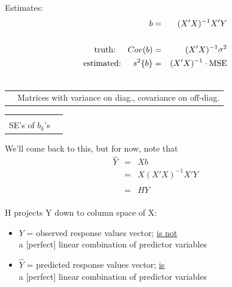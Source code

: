 \documentclass[12pt]{notes}
\begin{document}
Estimates:
\begin{eqnarray}
  b & = & (X' X)^{-1} X' Y \nonumber \\
   & \nonumber \\
  \mbox{truth: \hspace{1em}} Cov(b) & = & (X' X)^{-1} \sigma^2 \nonumber \\
  \mbox{estimated: \hspace{1em}}  s^2 \{ b \} & = & (X' X)^{-1} \cdot \mbox{MSE} \nonumber \\
   & \nonumber
\end{eqnarray}

\vspace{-8.5em}
\begin{tabular}{l l}
\hspace{30em} &
\begin{minipage}[t]{2in}
 Matrices with variance on diag., covariance on off-diag.
\end{minipage}
\end{tabular}

\vspace{2.75em}
\begin{tabular}{l l}
\hspace{32em} &
\begin{minipage}[t]{2in}
 $\sqrt{\mbox{diag. elements}}$ gives\\ SE's of $b_k$'s
\end{minipage}
\end{tabular}

\vspace{1em}

We'll come back to this, but for now, note that
\begin{eqnarray}
  \hat{Y} & = & X b \nonumber \\
          & = & X (X' X)^{-1} X' Y \nonumber \\
          & \nonumber \\
          & = & H Y \nonumber \\
          & \nonumber
\end{eqnarray}

H projects Y down to column space of X:\\

\begin{minipage}[t]{4in}
  \begin{itemize}
    \item $Y$ = observed response values vector; \underline{is not}\\ a [perfect] linear combination of predictor variables
    \item $\hat{Y}$ = predicted response values vector; \underline{is}\\ a [perfect] linear combination of predictor variables
  \end{itemize}
\end{minipage}













\end{document}
